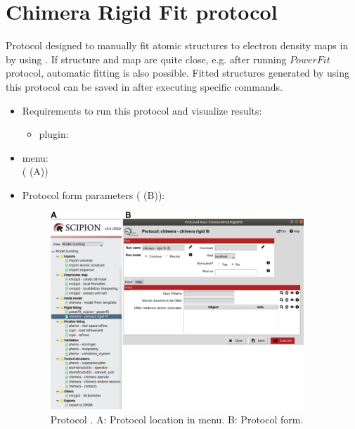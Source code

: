 \section{Chimera Rigid Fit protocol}
\label{app:chimeraRigidFit}%
Protocol designed to manually fit atomic structures to electron density maps in \scipion by using \chimera. If structure and map are quite close, e.g. after running $PowerFit$ protocol, automatic fitting is also possible. Fitted structures generated by using this protocol can be saved in \scipion after executing specific \chimera commands.
   
 \begin{itemize}
  \item Requirements to run this protocol and visualize results:
    \begin{itemize}
        \item \scipion plugin: 
    \end{itemize}
  \item \scipion menu:\\
    ( (A))
  
  \item Protocol form parameters ( (B)):
  
    \begin{figure}[H]
     \centering 
     \captionsetup{width=.7\linewidth} 
     \includegraphics[width=0.90\textwidth]{Images_appendix/Fig116.pdf}
     \caption{Protocol . A: Protocol location in \scipion menu. B: Protocol form.}
     \label{fig:app_protocol_chimera_1}
    \end{figure}
    

\end{itemize}
